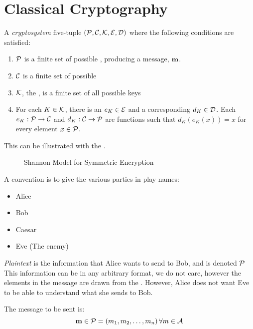 \section{Classical Cryptography}\label{sec:Classical_Cryptography}
\begin{definition}[Cryptosystem]\label{def:Cryptosystem}
  A \emph{cryptosystem} five-tuple $(\operatorname{\mathcal{P}}, \operatorname{\mathcal{C}}, \operatorname{\mathcal{K}}, \operatorname{\mathcal{E}}, \operatorname{\mathcal{D}})$ where the following conditions are satisfied:
  \begin{enumerate}[noitemsep]
  \item $\operatorname{\mathcal{P}}$ is a finite set of possible \emph{}, producing a message, $\operatorname{\mathbf{m}}$.
  \item $\operatorname{\mathcal{C}}$ is a finite set of possible \emph{}
  \item $\operatorname{\mathcal{K}}$, the \emph{}, is a finite set of all possible keys
  \item For each $K \in \operatorname{\mathcal{K}}$, there is an \emph{} $e_{K}\in \operatorname{\mathcal{E}}$ and a corresponding \emph{} $d_{K} \in \operatorname{\mathcal{D}}$.
    Each $e_{K} : \operatorname{\mathcal{P}} \rightarrow \operatorname{\mathcal{C}}$ and $d_{K} : \operatorname{\mathcal{C}} \rightarrow \operatorname{\mathcal{P}}$ are functions such that $d_{K} \left( e_{K}(x) \right) = x$ for every  element $x \in \operatorname{\mathcal{P}}$.
  \end{enumerate}
\end{definition}

This can be illustrated with the .

\begin{figure}[h!]
  \centering
  \caption{Shannon Model for Symmetric Encryption}
  \label{fig:Shannon_Model_Symmetric_Encryption}
\end{figure}

A convention is to give the various parties in play names:
\begin{itemize}[noitemsep]
\item Alice
\item Bob
\item Caesar
\item Eve (The enemy)
\end{itemize}

\begin{definition}[Plaintext]\label{def:Plaintext}
  \emph{Plaintext} is the information that Alice wants to send to Bob, and is denoted $\operatorname{\mathcal{P}}$
  This information can be in any arbitrary format, we do not care, however the elements in the message are drawn from the .
  However, Alice does not want Eve to be able to understand what she sends to Bob.

  The message to be sent is:
  \begin{equation}\label{eq:Plaintext}
    \operatorname{\mathbf{m}} \in \operatorname{\mathcal{P}} = \left( m_{1}, m_{2}, \ldots, m_{n} \right) \forall m \in \operatorname{\mathcal{A}}
  \end{equation}
\end{definition}


